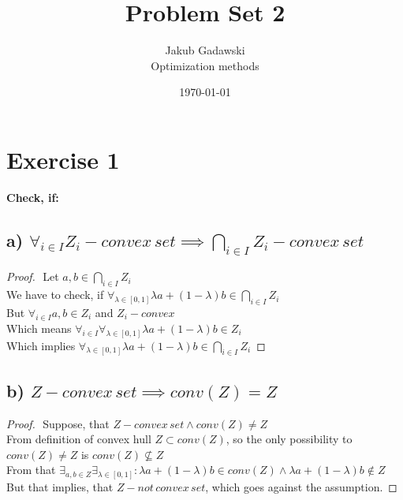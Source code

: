 \documentclass[12pt]{article}
\title{Problem Set 2} %
\author{Jakub Gadawski\\ %
Optimization methods
}
\date{\today} %
\begin{document}
\setlength{\droptitle}{-5em}    
\maketitle


\section*{Exercise 1}
{\bfseries Check, if:}

\subsection*{a) \( \forall_{i \in I} Z_i - convex \, set \implies \bigcap_{i \in I} Z_i - convex\,set\)}
\begin{proof}
$ $\newline
Let \(a,b \in \bigcap_{i \in I} Z_i\)\\
We have to check, if \(\forall_{\lambda \in [0,1]} \lambda a + (1-\lambda)b \in \bigcap_{i \in I} Z_i\)\\
But \( \forall_{i \in I} a, b \in Z_i\) and \(Z_i - convex\)\\
Which means \(\forall_{i \in I} \forall_{\lambda \in [0,1]} \lambda a + (1-\lambda)b \in Z_i\)\\
Which implies \(\forall_{\lambda \in [0,1]} \lambda a + (1-\lambda)b \in \bigcap_{i \in I} Z_i\)
\end{proof}


\subsection*{b) \( Z - convex\,set \implies conv(Z) = Z \)}
\begin{proof}
$ $\newline
Suppose, that \( Z - convex\,set \land conv(Z) \neq Z \)\\
From definition of convex hull \(Z \subset conv(Z)\), so the only possibility to \(conv(Z) \neq Z\) is \(conv(Z) \nsubseteq Z\)\\
From that \(\exists_{a,b \in Z}\exists_{\lambda\in [0,1]}: \lambda a + (1-\lambda)b \in conv(Z) \land \lambda a + (1-\lambda)b \notin Z \)\\
But that implies, that \(Z - not\,convex\,set\), which goes against the assumption.
\end{proof}
\end{document}

